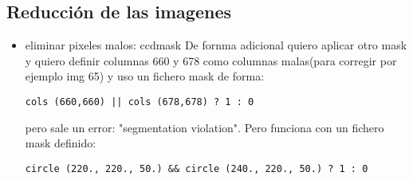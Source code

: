 \documentclass{article}
\begin{document}
\subsection*{Reducción de las imagenes}
\begin{itemize}
\item eliminar pixeles malos: ccdmask
De fornma adicional quiero aplicar otro mask y quiero definir columnas 660 y 678 como columnas malas(para corregir por ejemplo img 65) y uso un fichero mask de forma:
\begin{verbatim}
cols (660,660) || cols (678,678) ? 1 : 0
\end{verbatim}
pero sale un error: "segmentation violation". Pero funciona con un fichero mask definido:
\begin{verbatim}
circle (220., 220., 50.) && circle (240., 220., 50.) ? 1 : 0
\end{verbatim}





\end{itemize}
\end{document}
